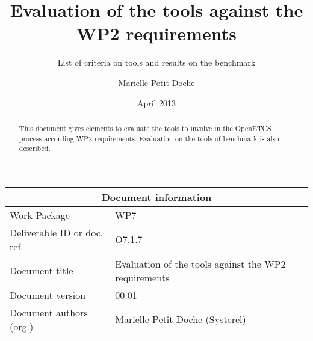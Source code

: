 \documentclass{template/openetcs_report}
\begin{document}
\frontmatter
{}




\title{Evaluation of the tools against the WP2 requirements }

\subtitle{List of criteria on tools and results on the benchmark}

\date{April 2013}


\author{Marielle Petit-Doche}

 


\begin{abstract}
This document gives elements to evaluate the tools to involve in the OpenETCS process according WP2 requirements. Evaluation on the tools of benchmark is also described.

\end{abstract}

\maketitle
\tableofcontents
\listoffiguresandtables
\newpage


\begin{tabular}{|p{4.4cm}|p{8.7cm}|}
\hline
\multicolumn{2}{|c|}{Document information} \\
\hline
Work Package &  WP7  \\
Deliverable ID or doc. ref. & O7.1.7\\
\hline
Document title & Evaluation of the tools against the WP2 requirements \\
Document version & 00.01 \\
Document authors (org.)  & Marielle Petit-Doche (Systerel)  \\
\hline
\end{tabular}
\end{document}
